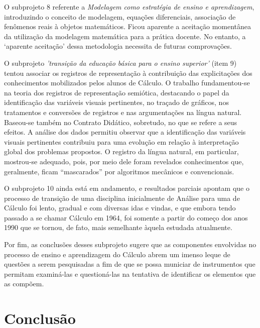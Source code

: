 \documentclass[
	12pt,				%
	openright,			%
	oneside,
	a4paper,			%
	chapter=TITLE,		%
	section=TITLE,		%
	sumario=abnt-6027-2012,
	english,			%
	brazil				%
]{abntex2}
\begin{document}
	O subprojeto 8 referente a \textit{Modelagem como estratégia de ensino e aprendizagem}, introduzindo o conceito de modelagem, equações diferenciais, associação de fenômenos reais à objetos matemáticos. Ficou aparente a aceitação momentânea da utilização da modelagem matemática para a prática docente. No entanto, a ‘aparente aceitação’ dessa metodologia necessita de futuras comprovações.
	
	O subprojeto \textit{'transição da educação básica para o ensino superior'} (item 9) tentou associar os registros de representação à contribuição das explicitações dos conhecimentos mobilizados pelos alunos de Cálculo. O trabalho fundamentou-se na teoria dos registros de representação semiótica, destacando o papel da identificação das variáveis visuais pertinentes, no traçado de gráficos, nos tratamentos e conversões de registros e nas argumentações na língua natural. Baseou-se também no Contrato Didático, sobretudo, no que se refere a seus efeitos. A análise dos dados permitiu observar que a identificação das variáveis visuais pertinentes contribuiu para uma evolução em relação à interpretação global dos problemas propostos. O registro da língua natural, em particular, mostrou-se adequado, pois, por meio dele foram revelados conhecimentos que, geralmente, ficam “mascarados” por algoritmos mecânicos e convencionais.
	
	O subprojeto 10 ainda está em andamento, e resultados parciais apontam que o processo de transição de uma disciplina inicialmente de Análise para uma de Cálculo foi lento, gradual e com diversas idas e vindas, e que embora tendo passado a se chamar Cálculo em 1964, foi somente a partir do começo dos anos 1990 que se tornou, de fato, mais semelhante àquela estudada atualmente.
	
	Por fim, as conclusões desses subprojeto sugere que as componentes envolvidas no processo de ensino e aprendizagem do Cálculo abrem um imenso leque de questões a serem pesquisadas a fim de que se possa municiar de instrumentos que permitam examiná-las e questioná-las na tentativa de identificar os elementos que as compõem. 			
	

\chapter{Conclusão}
\end{document}
